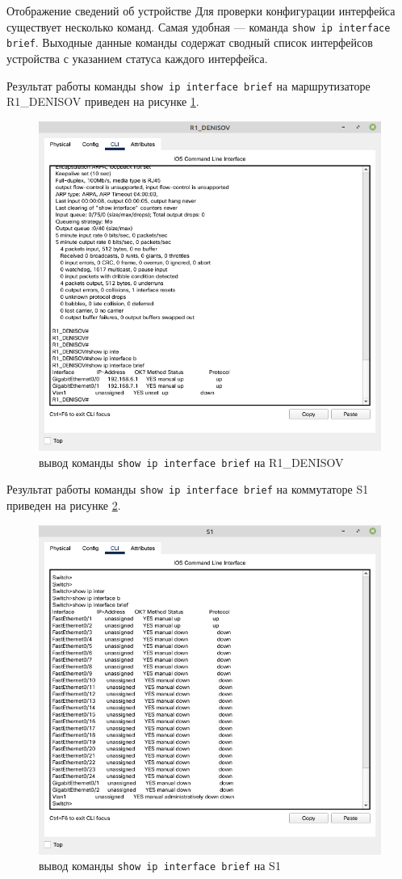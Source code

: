 \documentclass[a4paper,14pt]{extarticle}
\begin{document}
\begin{mypart}{Отображение сведений об устройстве}
Для проверки конфигурации интерфейса существует несколько команд. Самая удобная --- команда \texttt{show ip interface brief}. Выходные данные команды содержат сводный список интерфейсов устройства с указанием статуса каждого интерфейса. 

Результат работы команды \texttt{show ip interface brief} на маршрутизаторе R1\_DENISOV приведен на рисунке \ref{fig:pract5-ip-interface}.
\begin{figure}[h!]
	\centering
	\includegraphics[width=0.5\linewidth]{images/pract5-ip-interface}
	\caption{вывод команды \texttt{show ip interface brief} на R1\_DENISOV}
	\label{fig:pract5-ip-interface}
\end{figure}

Результат работы команды \texttt{show ip interface brief} на коммутаторе S1 приведен на рисунке \ref{fig:pract5-ip-interface-s1}.

\begin{figure}[h!]
	\centering
	\includegraphics[width=0.5\linewidth]{images/pract5-ip-interface-s1}
	\caption{вывод команды \texttt{show ip interface brief} на S1}
	\label{fig:pract5-ip-interface-s1}
\end{figure}
\end{mypart}
\end{document}
